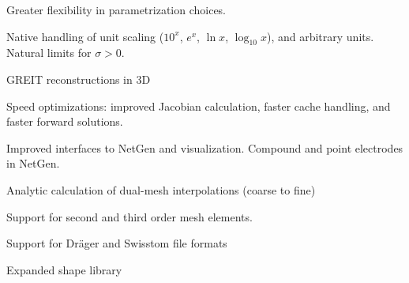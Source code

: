 \documentclass[portrait,final,a0paper,fontscale=0.277]{baposter}
\begin{document}
\begin{poster}
{\colouredcircle
   Greater flexibility in parametrization choices.

\colouredcircle
   Native handling of unit scaling ($10^x$, $e^x$, $\ln x$, $\log_{10} x$),
 and arbitrary units.
  Natural limits for $\sigma > 0$. %

\colouredcircle
   GREIT reconstructions in 3D

\colouredcircle
   Speed optimizations: improved Jacobian calculation, faster cache handling, and 
  faster forward solutions.


\colouredcircle
   Improved interfaces to NetGen and visualization.
      Compound and point electrodes in NetGen.

\colouredcircle
   Analytic calculation of dual-mesh interpolations (coarse to fine)

\colouredcircle
   Support for second and third order mesh elements.

\colouredcircle
   Support for Dr\"ager and Swisstom file formats

\colouredcircle
   Expanded shape library
   \vspace{0.6em}
   \vfil
  }


\end{poster}
\end{document}
